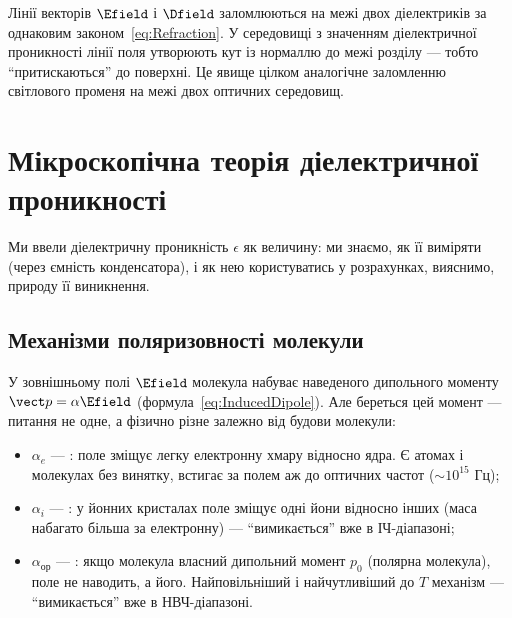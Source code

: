\begin{Attention}
	Лінії векторів $\Efield$ і $\Dfield$ заломлюються на межі двох діелектриків за однаковим законом~\eqref{eq:Refraction}. У середовищі з
	 значенням діелектричної проникності лінії поля утворюють  кут із нормаллю до межі розділу --- тобто \enquote{притискаються}
	до поверхні. Це явище цілком аналогічне заломленню світлового променя на межі двох оптичних середовищ.
\end{Attention}



\section{Мікроскопічна теорія діелектричної проникності}

Ми ввели діелектричну проникність $\epsilon$ як  величину: ми знаємо, як її виміряти (через ємність
конденсатора), і як нею користуватись у розрахунках, вияснимо, природу її виникнення.

\subsection*{Механізми поляризовності молекули}\label{sec:AtomPolarizability}

У зовнішньому полі $\Efield$ молекула набуває наведеного дипольного моменту $\vect p = \alpha\Efield$ (формула~\eqref{eq:InducedDipole}). Але
 береться цей момент --- питання не одне, а фізично різне залежно від будови молекули:

\begin{itemize}
	\item $\alpha_e$ --- : поле зміщує легку електронну хмару відносно ядра. Є  атомах і молекулах без винятку,
	      встигає за полем аж до оптичних частот ($\sim10^{15}$ Гц);
	\item $\alpha_i$ --- : у йонних кристалах поле зміщує одні йони відносно інших (маса набагато більша за електронну) ---
	      \enquote{вимикається} вже в ІЧ-діапазоні;
	\item $\alpha_\text{ор}$ --- : якщо молекула  власний дипольний момент $p_0$ (полярна молекула), поле не
	      наводить, а  його. Найповільніший і найчутливіший до $T$ механізм --- \enquote{вимикається} вже в НВЧ-діапазоні.
\end{itemize}

